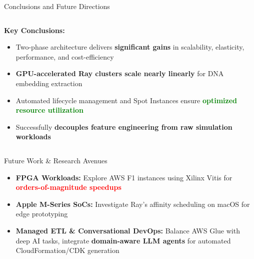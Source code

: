 \documentclass[aspectratio=169]{beamer}
\begin{document}
\begin{frame}{Conclusions and Future Directions}
    \begin{columns}
        \begin{column}{0.6\textwidth}
            \textbf{Key Conclusions:}
            \begin{itemize}
                \item Two-phase architecture delivers \textbf{significant gains} in scalability, elasticity, performance, and cost-efficiency
                \item \textcolor{rayblue}{\textbf{GPU-accelerated Ray clusters scale nearly linearly}} for DNA embedding extraction
                \item Automated lifecycle management and Spot Instances ensure \textcolor{green}{\textbf{optimized resource utilization}}
                \item Successfully \textbf{decouples feature engineering from raw simulation workloads}
            \end{itemize}
        \end{column}
        \begin{column}{0.4\textwidth}
        \end{column}
    \end{columns}
    
    \vspace{0.3cm}
    \begin{block}{Future Work \& Research Avenues}
        \begin{itemize}
            \item \textbf{FPGA Workloads:} Explore AWS F1 instances using Xilinx Vitis for \textcolor{red}{\textbf{orders-of-magnitude speedups}}
            \item \textbf{Apple M-Series SoCs:} Investigate Ray's affinity scheduling on macOS for edge prototyping
            \item \textbf{Managed ETL \& Conversational DevOps:} Balance AWS Glue with deep AI tasks, integrate \textcolor{rayblue}{\textbf{domain-aware LLM agents}} for automated CloudFormation/CDK generation
        \end{itemize}
    \end{block}
\end{frame}
\end{document}
